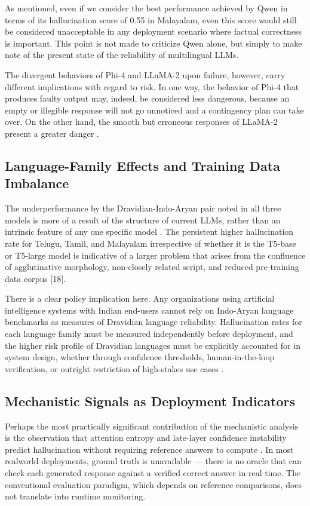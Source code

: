 \documentclass[conference]{IEEEtran}
\begin{document}
As mentioned, even if we consider the best performance achieved by Qwen in terms of its hallucination score of 0.55 in Malayalam, even this score would still be considered unacceptable in any deployment scenario where factual correctness is important. This point is not made to criticize Qwen alone, but simply to make note of the present state of the reliability of multilingual LLMs.

The divergent behaviors of Phi-4 and LLaMA-2 upon failure,
however, carry different implications with regard to risk. In one
way, the behavior of Phi-4 that produces faulty output may,
indeed, be considered less dangerous, because an empty or
illegible response will not go unnoticed and a contingency plan
can take over. On the other hand, the smooth but erroneous
responses of LLaMA-2 present a greater danger \cite{b2}.

\subsection{Language-Family Effects and Training Data Imbalance}

The underperformance by the Dravidian-Indo-Aryan
pair noted in all three models is more of a result of the structure
of current LLMs, rather than an intrinsic feature of any one specific
model \cite{b16}. The persistent higher hallucination rate for Telugu,
Tamil, and Malayalam irrespective of whether it is the T5-base
or T5-large model is indicative of a larger problem that arises
from the confluence of agglutinative morphology, non-closely
related script, and reduced pre-training data corpus [18].

There is a clear policy implication here. Any organizations using
artificial intelligence systems with Indian end-users cannot rely on Indo-Aryan language benchmarks as measures of Dravidian
language reliability.  Hallucination rates for each language family
must be measured independently before deployment, and the
higher risk profile of Dravidian languages must be explicitly
accounted for in system design, whether through confidence
thresholds, human-in-the-loop verification, or outright restriction of high-stakes use cases \cite{b24}.

\subsection{Mechanistic Signals as Deployment Indicators}

Perhaps the most practically significant contribution of the
mechanistic analysis is the observation that attention entropy
and late-layer confidence instability predict hallucination without requiring reference answers to compute \cite{b27}. In most realworld deployments, ground truth is unavailable — there is no
oracle that can check each generated response against a verified correct answer in real time. The conventional evaluation
paradigm, which depends on reference comparisons, does not
translate into runtime monitoring.
\end{document}
